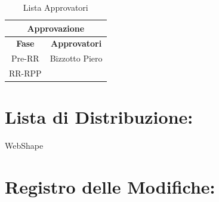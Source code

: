 \begin{table}[!h]
	\begin{center}
		\begin{tabular}
			{|c|c|}
			\hline
			\multicolumn{2}{|c|}{ \textbf{Approvazione} } \\
			\hline
			\textbf{Fase} & \textbf{Approvatori} \\
			\hline
			{Pre-RR} & Bizzotto Piero \\
			\hline
			{RR-RPP} & \\
			\hline
		\end{tabular}
		\caption{Lista Approvatori} %
		\label{tabapprovazione}
	\end{center}
\end{table}
\textbf{}


\section*{\LARGE Lista di Distribuzione:}

	\begin{elenconumerato}{\normindent}
		\item WebShape 
	\end{elenconumerato}

\newpage

\section*{\LARGE Registro delle Modifiche:}

